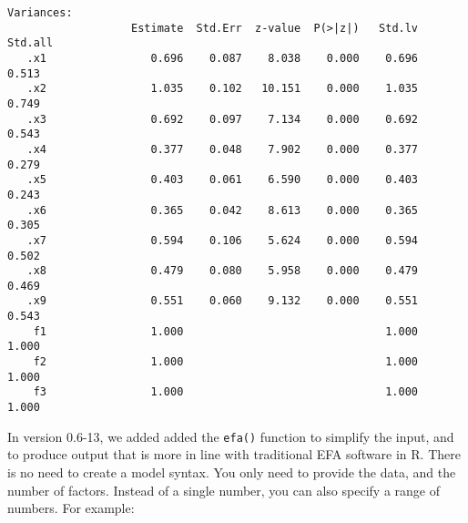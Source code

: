 \begin{verbatim}
Variances:
                   Estimate  Std.Err  z-value  P(>|z|)   Std.lv  Std.all
   .x1                0.696    0.087    8.038    0.000    0.696    0.513
   .x2                1.035    0.102   10.151    0.000    1.035    0.749
   .x3                0.692    0.097    7.134    0.000    0.692    0.543
   .x4                0.377    0.048    7.902    0.000    0.377    0.279
   .x5                0.403    0.061    6.590    0.000    0.403    0.243
   .x6                0.365    0.042    8.613    0.000    0.365    0.305
   .x7                0.594    0.106    5.624    0.000    0.594    0.502
   .x8                0.479    0.080    5.958    0.000    0.479    0.469
   .x9                0.551    0.060    9.132    0.000    0.551    0.543
    f1                1.000                               1.000    1.000
    f2                1.000                               1.000    1.000
    f3                1.000                               1.000    1.000
\end{verbatim}

In version 0.6-13, we added added the \texttt{efa()} function to
simplify the input, and to produce output that is more in line with
traditional EFA software in R. There is no need to create a model
syntax. You only need to provide the data, and the number of factors.
Instead of a single number, you can also specify a range of numbers. For
example:

\begin{Shaded}
\begin{Highlighting}[]
\OtherTok{\textless{}{-}} \NormalTok{(}\NormalTok{, }\SpecialCharTok{:}\NormalTok{, } \NormalTok{)}
\OtherTok{\textless{}{-}} \NormalTok{(} \SpecialCharTok{:}\NormalTok{)}
\end{Highlighting}
\end{Shaded}

